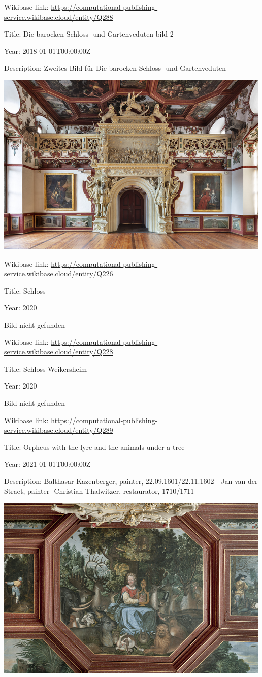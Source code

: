 \documentclass[
  letterpaper,
]{book}
\begin{document}
Wikibase link:
\url{https://computational-publishing-service.wikibase.cloud/entity/Q288}

Title: Die barocken Schloss- und Gartenveduten bild 2

Year: 2018-01-01T00:00:00Z

Description: Zweites Bild für Die barocken Schloss- und Gartenveduten

\includegraphics{paintings_files/figure-pdf/cell-3-output-108.png}

Wikibase link:
\url{https://computational-publishing-service.wikibase.cloud/entity/Q226}

Title: Schloss

Year: 2020

Bild nicht gefunden

Wikibase link:
\url{https://computational-publishing-service.wikibase.cloud/entity/Q228}

Title: Schloss Weikersheim

Year: 2020

Bild nicht gefunden

Wikibase link:
\url{https://computational-publishing-service.wikibase.cloud/entity/Q289}

Title: Orpheus with the lyre and the animals under a tree

Year: 2021-01-01T00:00:00Z

Description: Balthasar Kazenberger, painter, 22.09.1601/22.11.1602 - Jan
van der Straet, painter- Christian Thalwitzer, restaurator, 1710/1711

\includegraphics{paintings_files/figure-pdf/cell-3-output-110.png}
\end{document}
